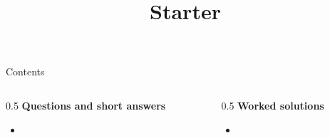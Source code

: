 \documentclass[aspectratio=169]{beamer}
\title{Starter}
\author{}
\date{}
\begin{document}
\frame{\titlepage}

\begin{frame}{Contents}
\small
\begin{columns}[T]
  \begin{column}{0.5\textwidth}
    \textbf{Questions and short answers}
    \begin{itemize}
      \item \hyperlink{q-st1}{}
    \end{itemize}
  \end{column}
  \begin{column}{0.5\textwidth}
    \textbf{Worked solutions}
    \begin{itemize}
      \item \hyperlink{work-st1}{}
    \end{itemize}
  \end{column}
\end{columns}
\end{frame}
\end{document}
